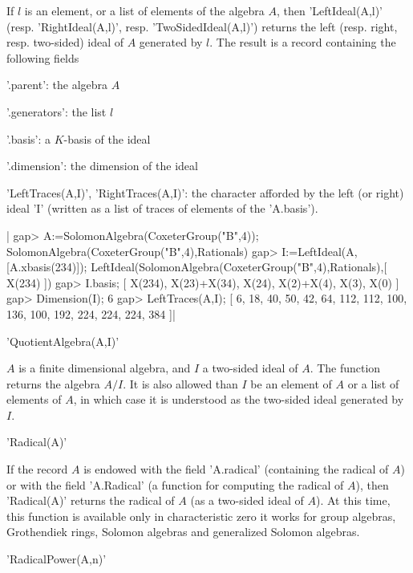 If  $l$ is  an element,  or a  list of  elements of  the algebra  $A$, then
'LeftIdeal(A,l)'   (resp.  'RightIdeal(A,l)',  resp.  'TwoSidedIdeal(A,l)')
returns  the left (resp. right, resp.  two-sided) ideal of $A$ generated by
$l$. The result is a record containing the following fields\:

'.parent': the algebra $A$

'.generators': the list $l$

'.basis': a $K$-basis of the ideal

'.dimension': the dimension of the ideal

'LeftTraces(A,I)', 'RightTraces(A,I)':
the  character afforded by the left (or right) ideal 'I' (written as a
list of traces of elements of the 'A.basis').

|    gap> A:=SolomonAlgebra(CoxeterGroup("B",4));
    SolomonAlgebra(CoxeterGroup("B",4),Rationals)
    gap> I:=LeftIdeal(A,[A.xbasis(234)]);
    LeftIdeal(SolomonAlgebra(CoxeterGroup("B",4),Rationals),[ X(234) ])
    gap> I.basis;
    [ X(234), X(23)+X(34), X(24), X(2)+X(4), X(3), X(0) ]
    gap> Dimension(I);
    6
    gap> LeftTraces(A,I);
    [ 6, 18, 40, 50, 42, 64, 112, 112, 100, 136, 100, 192, 224, 224, 224,
    384 ]|

'QuotientAlgebra(A,I)'

$A$  is a finite dimensional algebra, and $I$ a two-sided ideal of $A$. The
function  returns the  algebra $A/I$.  It is  also allowed  than $I$  be an
element of $A$ or a list of elements of $A$, in which case it is understood
as the two-sided ideal generated by $I$.


'Radical(A)'

If  the record  $A$ is  endowed with  the field 'A.radical' (containing the
radical of $A$) or with the field 'A.Radical' (a function for computing the
radical  of  $A$),  then  'Radical(A)'  returns  the  radical  of $A$ (as a
two-sided  ideal of $A$). At this time,  this function is available only in
characteristic  zero\:  it  works  for  group  algebras,  Grothendiek rings,
Solomon algebras and generalized Solomon algebras.

'RadicalPower(A,n)'

